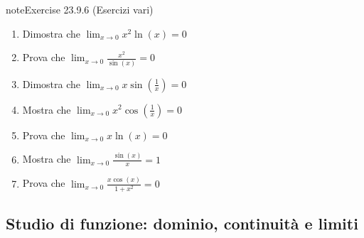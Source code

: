 \documentclass[letterpaper,10pt,italian]{jupyterBook}
\begin{document}
\begin{sphinxadmonition}{note}{Exercise 23.9.6 (Esercizi vari)}
\begin{enumerate}
\item {} 
\sphinxAtStartPar
Dimostra che \(\lim_{x \to 0} x^2 \ln(x) = 0\)

\item {} 
\sphinxAtStartPar
Prova che \(\lim_{x \to 0} \frac{x^2}{\sin(x)} = 0\)

\item {} 
\sphinxAtStartPar
Dimostra che \(\lim_{x \to 0} x \sin\left(\frac{1}{x}\right) = 0\)

\item {} 
\sphinxAtStartPar
Mostra che \(\lim_{x \to 0} x^2 \cos\left(\frac{1}{x}\right) = 0\)

\item {} 
\sphinxAtStartPar
Prova che \(\lim_{x \to 0} x \ln(x) = 0\)

\item {} 
\sphinxAtStartPar
Mostra che \(\lim_{x \to 0} \frac{\sin(x)}{x} = 1\)

\item {} 
\sphinxAtStartPar
Prova che \(\lim_{x \to 0} \frac{x \cos(x)}{1 + x^2} = 0\)

\end{enumerate}
\end{sphinxadmonition}


\subsection{Studio di funzione: dominio, continuità e limiti}
\label{\detokenize{ch/infinitesimal_calculus/analysis-problems:studio-di-funzione-dominio-continuita-e-limiti}} \label{exercise:ch/infinitesimal_calculus/analysis-problems-exercise-6}
\end{document}
